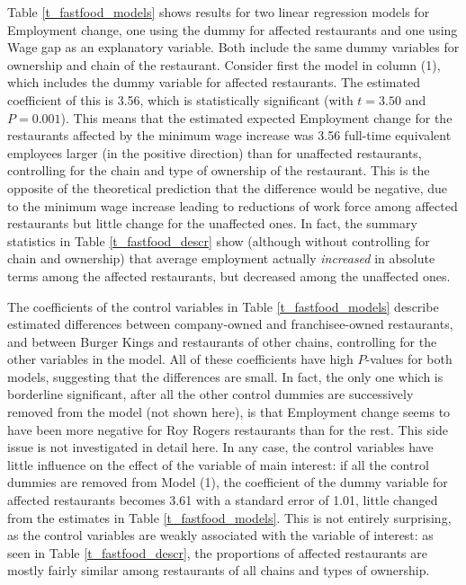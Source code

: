 Table \ref{t_fastfood_models} shows results for two linear regression
models for Employment change, one using the dummy for affected
restaurants and one using Wage gap as an explanatory variable. Both
include the same dummy variables for ownership and chain of the
restaurant. Consider first the model in column (1), which includes the
dummy variable for affected restaurants. The estimated coefficient of
this is 3.56, which is statistically significant (with $t=3.50$ and
$P=0.001$). This means that the estimated expected Employment change for
the restaurants affected by the minimum wage increase was 3.56 full-time
equivalent employees larger (in the positive direction) than for
unaffected restaurants, controlling for the chain and type of ownership
of the restaurant. This is the opposite of the theoretical prediction
that the difference would be negative, due to the minimum wage increase
leading to reductions of work force among affected restaurants but
little change for the unaffected ones. In fact, the summary statistics
in Table \ref{t_fastfood_descr} show (although without controlling for
chain and ownership) that average employment actually \emph{increased}
in absolute terms among the affected restaurants, but decreased among
the unaffected ones.

The coefficients of the control variables in Table
\ref{t_fastfood_models} describe estimated differences between
company-owned and franchisee-owned restaurants, and between Burger Kings
and restaurants of other chains, controlling for the other variables in
the model. All of these coefficients have high $P$-values for both
models, suggesting that the differences are small. In fact, the only one
which is borderline significant, after all the other control dummies are
successively removed from the model (not shown here), is that
Employment change seems to have been more negative for Roy Rogers
restaurants than for the rest. This side issue is not investigated in
detail here. In any case, the control variables have little influence on
the effect of the variable of main interest: if all the
control dummies are removed from Model (1), the coefficient of the dummy variable
for affected restaurants becomes 3.61 with a standard error of 1.01,
little changed from the estimates in Table \ref{t_fastfood_models}. This
is not entirely surprising, as the control variables are weakly
associated with the variable of interest: as seen in Table
\ref{t_fastfood_descr}, the proportions of affected restaurants are
mostly fairly similar among restaurants of all chains and types of
ownership.

